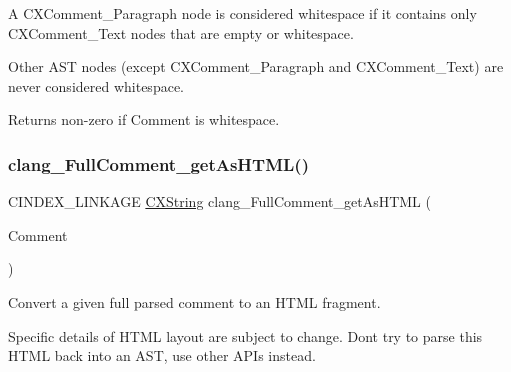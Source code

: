 A {\ttfamily C\+X\+Comment\+\_\+\+Paragraph} node is considered whitespace if it contains only {\ttfamily C\+X\+Comment\+\_\+\+Text} nodes that are empty or whitespace. 

Other A\+ST nodes (except {\ttfamily C\+X\+Comment\+\_\+\+Paragraph} and {\ttfamily C\+X\+Comment\+\_\+\+Text}) are never considered whitespace.

\begin{DoxyReturn}{Returns}
non-\/zero if {\ttfamily Comment} is whitespace. 
\end{DoxyReturn}
\mbox{\label{group__CINDEX__COMMENT_gafdfc03bbfdddd06c380a2644f16ccba9}} 
\subsubsection{\texorpdfstring{clang\+\_\+\+Full\+Comment\+\_\+get\+As\+H\+T\+M\+L()}{clang\_FullComment\_getAsHTML()}}
{\footnotesize\ttfamily C\+I\+N\+D\+E\+X\+\_\+\+L\+I\+N\+K\+A\+GE \hyperlink{structCXString}{C\+X\+String} clang\+\_\+\+Full\+Comment\+\_\+get\+As\+H\+T\+ML (\begin{DoxyParamCaption}\item[{\hyperlink{structCXComment}{C\+X\+Comment}}]{Comment }\end{DoxyParamCaption})}



Convert a given full parsed comment to an H\+T\+ML fragment. 

Specific details of H\+T\+ML layout are subject to change. Don\textquotesingle{}t try to parse this H\+T\+ML back into an A\+ST, use other A\+P\+Is instead.

